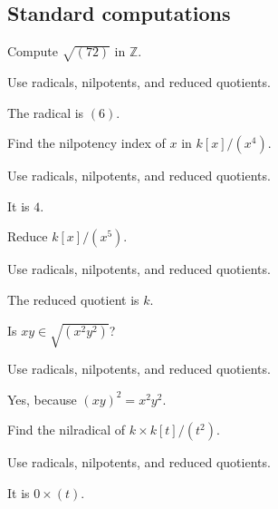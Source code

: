 \subsection*{Standard computations}

\begin{exercise}\label{exr:v03-expand-01}
Compute $\sqrt{(72)}$ in $\mathbb Z$.
\end{exercise}
\begin{hint}
Use radicals, nilpotents, and reduced quotients.
\end{hint}
\begin{solution}
The radical is $(6)$.
\end{solution}

\begin{exercise}\label{exr:v03-expand-02}
Find the nilpotency index of $x$ in $k[x]/(x^4)$.
\end{exercise}
\begin{hint}
Use radicals, nilpotents, and reduced quotients.
\end{hint}
\begin{solution}
It is $4$.
\end{solution}

\begin{exercise}\label{exr:v03-expand-03}
Reduce $k[x]/(x^5)$.
\end{exercise}
\begin{hint}
Use radicals, nilpotents, and reduced quotients.
\end{hint}
\begin{solution}
The reduced quotient is $k$.
\end{solution}

\begin{exercise}\label{exr:v03-expand-04}
Is $xy\in\sqrt{(x^2y^2)}$?
\end{exercise}
\begin{hint}
Use radicals, nilpotents, and reduced quotients.
\end{hint}
\begin{solution}
Yes, because $(xy)^2=x^2y^2$.
\end{solution}

\begin{exercise}\label{exr:v03-expand-05}
Find the nilradical of $k\times k[t]/(t^2)$.
\end{exercise}
\begin{hint}
Use radicals, nilpotents, and reduced quotients.
\end{hint}
\begin{solution}
It is $0\times(t)$.
\end{solution}

